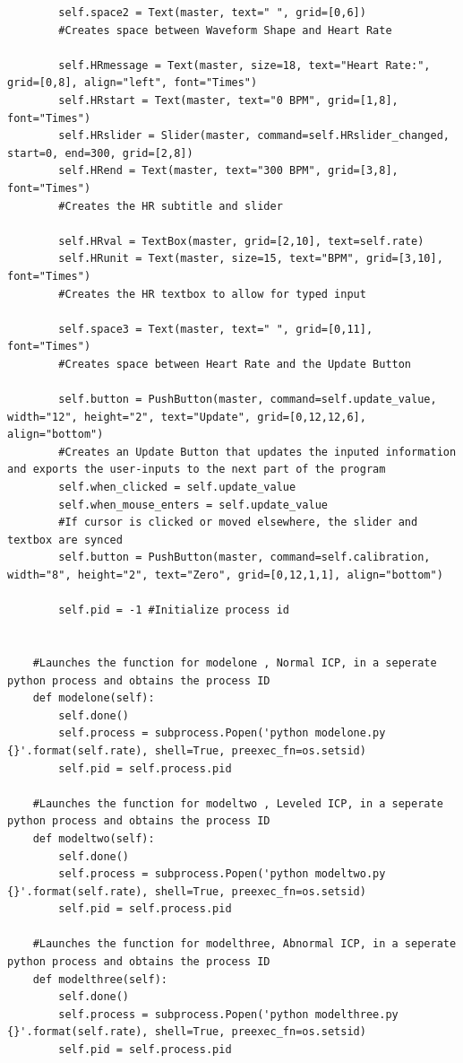 \documentclass[12pt]{report}
\begin{document}
\begin{lstlisting}
        self.space2 = Text(master, text=" ", grid=[0,6])
        #Creates space between Waveform Shape and Heart Rate

        self.HRmessage = Text(master, size=18, text="Heart Rate:", grid=[0,8], align="left", font="Times")
        self.HRstart = Text(master, text="0 BPM", grid=[1,8], font="Times")
        self.HRslider = Slider(master, command=self.HRslider_changed, start=0, end=300, grid=[2,8])
        self.HRend = Text(master, text="300 BPM", grid=[3,8], font="Times")
        #Creates the HR subtitle and slider

        self.HRval = TextBox(master, grid=[2,10], text=self.rate)
        self.HRunit = Text(master, size=15, text="BPM", grid=[3,10], font="Times")
        #Creates the HR textbox to allow for typed input

        self.space3 = Text(master, text=" ", grid=[0,11], font="Times")
        #Creates space between Heart Rate and the Update Button

        self.button = PushButton(master, command=self.update_value, width="12", height="2", text="Update", grid=[0,12,12,6], align="bottom")
        #Creates an Update Button that updates the inputed information and exports the user-inputs to the next part of the program
        self.when_clicked = self.update_value
        self.when_mouse_enters = self.update_value
        #If cursor is clicked or moved elsewhere, the slider and textbox are synced
        self.button = PushButton(master, command=self.calibration, width="8", height="2", text="Zero", grid=[0,12,1,1], align="bottom")

        self.pid = -1 #Initialize process id


    #Launches the function for modelone , Normal ICP, in a seperate python process and obtains the process ID
    def modelone(self):
        self.done()
        self.process = subprocess.Popen('python modelone.py {}'.format(self.rate), shell=True, preexec_fn=os.setsid)
        self.pid = self.process.pid

    #Launches the function for modeltwo , Leveled ICP, in a seperate python process and obtains the process ID    
    def modeltwo(self):
        self.done()
        self.process = subprocess.Popen('python modeltwo.py {}'.format(self.rate), shell=True, preexec_fn=os.setsid)
        self.pid = self.process.pid

    #Launches the function for modelthree, Abnormal ICP, in a seperate python process and obtains the process ID    
    def modelthree(self):
        self.done()
        self.process = subprocess.Popen('python modelthree.py {}'.format(self.rate), shell=True, preexec_fn=os.setsid)
        self.pid = self.process.pid


\end{lstlisting}
\end{document}
